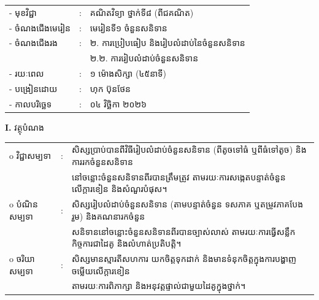 \documentclass[a4paper,10pt]{article}
\newcommand{\wcirc}{{\CourierBullet\fontsize{9.5pt}{11pt}\selectfont o}}
\begin{document}
{\renewcommand{\arraystretch}{1.10}
\hspace*{4.6cm}%
\begin{tabular}{@{}l l l@{}}
  - \hspace{0.35cm} មុខវិជ្ជា & : & គណិតវិទ្យា ថ្នាក់ទី៨ (ពីជគណិត) \\
  - \hspace{0.35cm} ចំណងជើងមេរៀន & : & មេរៀនទី១ ចំនួនសនិទាន \\
  - \hspace{0.35cm} ចំណងជើងរង & : & ២. ការប្រៀបធៀប និងរៀបលំដាប់នៃចំនួនសនិទាន \\
  & & ២.២. ការរៀបលំដាប់ចំនួនសនិទាន \\
  - \hspace{0.35cm} រយៈពេល & : & ១ ម៉ោងសិក្សា (៤៥នាទី) \\
  - \hspace{0.35cm} បង្រៀនដោយ & : & ហុក ប៊ុនថែន \\
  - \hspace{0.35cm} កាលបរិច្ឆេទ & : & ០៤ វិច្ឆិកា ២០២៦ \\
\end{tabular}

\vspace{3pt}

\textbf{I.} {\muol វត្ថុបំណង}\\[2pt]
\hspace*{0.55cm}%
\begin{tabular}{@{}l l l@{}}
  \wcirc \hspace{0.25cm} វិជ្ជាសម្បទា & : & សិស្សប្រាប់បានពីវិធីរៀបលំដាប់ចំនួនសនិទាន (ពីតូចទៅធំ ឬពីធំទៅតូច) និងការរកចំនួនសនិទាន \\
  & & នៅចន្លោះចំនួនសនិទានពីរបានត្រឹមត្រូវ តាមរយៈការសង្កេតបន្ទាត់ចំនួនលើក្ដារខៀន និងសំណួរបំផុស។ \\
  \wcirc \hspace{0.25cm} បំណិនសម្បទា & : & សិស្សរៀបលំដាប់ចំនួនសនិទាន (តាមបន្ទាត់ចំនួន ទសភាគ ឬតម្រូវភាគបែងរួម) និងគណនារកចំនួន \\
  & & សនិទាននៅចន្លោះចំនួនសនិទានពីរបានច្បាស់លាស់ តាមរយៈការធ្វើសន្លឹកកិច្ចការជាដៃគូ និងលំហាត់ប្រតិបត្តិ។ \\
  \wcirc \hspace{0.25cm} ចរិយាសម្បទា & : & សិស្សមានស្មារតីសហការ យកចិត្តទុកដាក់ និងមានទំនុកចិត្តក្នុងការបង្ហាញចម្លើយលើក្ដារខៀន \\
  & & តាមរយៈការពិភាក្សា និងអនុវត្តផ្ទាល់ជាមួយដៃគូក្នុងថ្នាក់។ \\
\end{tabular}

}
\end{document}
